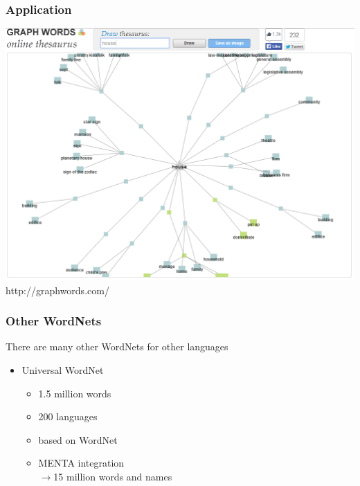\begin{frame}
\frametitle{Application}
\includegraphics[scale=0.29]{img/wordnet_app.png}\\
http://graphwords.com/
\end{frame}

\begin{frame}
\frametitle{Other WordNets}
There are many other WordNets for other languages
\begin{itemize}
\item Universal WordNet
\begin{itemize}
\item 1.5 million words
\item 200 languages
\item based on WordNet
\item MENTA integration\\
$\rightarrow$15 million words and names
\end{itemize}
\end{itemize}
\end{frame}